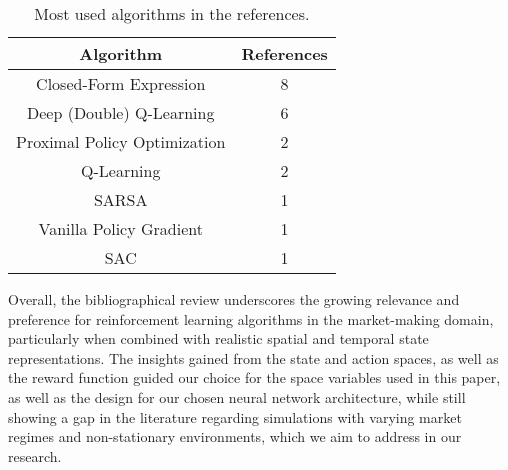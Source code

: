 \begin{table}
    \centering
    \begin{tabular}{|c|c|}
        \hline
        \textbf{Algorithm} & \textbf{References} \\
        \hline
        Closed-Form Expression & 8 \\
        Deep (Double) Q-Learning & 6 \\
        Proximal Policy Optimization & 2 \\
        Q-Learning & 2 \\
        SARSA & 1 \\
        Vanilla Policy Gradient & 1 \\
        SAC & 1 \\
        \hline
    \end{tabular}
    \caption{Most used algorithms in the references.}
    \label{tab:table1}
\end{table}

Overall, the bibliographical review underscores the growing relevance and preference for reinforcement learning algorithms in the market-making domain,
particularly when combined with realistic spatial and temporal state representations.
The insights gained from the state and action spaces, as well as the reward function guided our choice for the space variables used in this paper,
as well as the design for our chosen neural network architecture,
while still showing a gap in the literature regarding simulations with varying market regimes
and non-stationary environments, which we aim to address in our research.
